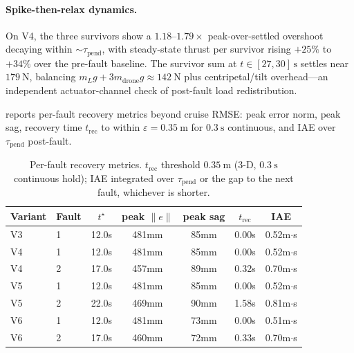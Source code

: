 \paragraph{Spike-then-relax dynamics.} On V4, the three survivors show a $1.18$--$1.79\times$ peak-over-settled overshoot decaying within $\sim\tau_{\mathrm{pend}}$, with steady-state thrust per survivor rising $+25\%$ to $+34\%$ over the pre-fault baseline. The survivor sum at $t\in[27,30]\,\si{\second}$ settles near $\SI{179}{\newton}$, balancing $m_L g+3m_{\mathrm{drone}}g\approx\SI{142}{\newton}$ plus centripetal/tilt overhead---an independent actuator-channel check of post-fault load redistribution.

 reports per-fault recovery metrics beyond cruise RMSE: peak error norm, peak sag, recovery time $t_{\mathrm{rec}}$ to within $\varepsilon=\SI{0.35}{\metre}$ for $\SI{0.3}{\second}$ continuous, and IAE over $\tau_{\mathrm{pend}}$ post-fault.

\begin{table}[htbp]
  \caption{Per-fault recovery metrics. $t_{\mathrm{rec}}$ threshold $\SI{0.35}{\metre}$ (3-D, $\SI{0.3}{\second}$ continuous hold); IAE integrated over $\tau_{\mathrm{pend}}$ or the gap to the next fault, whichever is shorter.}
  \label{tab:recovery-iae}
  \centering
  \small
  \begin{tabular}{llccccc}
    \toprule
    Variant & Fault & $t^\star$ & peak $\|e\|$ &
      peak sag & $t_{\mathrm{rec}}$ & IAE \\
    \midrule
    V3 & 1 & 12.0s & 481mm & 85mm & 0.00s & 0.52m$\cdot$s \\
    V4 & 1 & 12.0s & 481mm & 85mm & 0.00s & 0.52m$\cdot$s \\
    V4 & 2 & 17.0s & 457mm & 89mm & 0.32s & 0.70m$\cdot$s \\
    V5 & 1 & 12.0s & 481mm & 85mm & 0.00s & 0.52m$\cdot$s \\
    V5 & 2 & 22.0s & 469mm & 90mm & 1.58s & 0.81m$\cdot$s \\
    V6 & 1 & 12.0s & 481mm & 73mm & 0.00s & 0.51m$\cdot$s \\
    V6 & 2 & 17.0s & 460mm & 72mm & 0.33s & 0.70m$\cdot$s \\
    \bottomrule
  \end{tabular}
\end{table}


